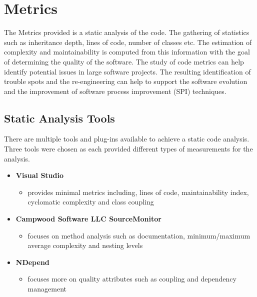 \section{Metrics}
		
	\normalsize
	{
		The Metrics provided is a static analysis of the code.  The gathering of statistics such as inheritance depth, lines of code, 
		number of classes etc.  The estimation of complexity and maintainability is computed from this information with the goal of 
		determining the quality of the software.  
		\newline
		\newline
		The study of code metrics can help identify potential issues in large software projects.
		The resulting identification of trouble spots and the re-engineering can help to support the software evolution and the
		improvement of software process improvement (SPI) techniques.

		\vspace{1mm}
		\subsection{Static Analysis Tools}
		There are multiple tools and plug-ins available to achieve a static code analysis.  Three tools were chosen as each provided
		different types of measurements for the analysis. 
		
		\vspace{1mm}
				
		\begin{itemize}
			\item \textbf{Visual Studio}
				\begin{itemize}
					\item provides minimal metrics including, lines of code, maintainability index, cyclomatic complexity and class coupling
				\end{itemize}
				
			\item \textbf{Campwood Software LLC SourceMonitor}
				\begin{itemize}
					\item focuses on method analysis such as documentation, minimum/maximum average complexity and nesting levels
				\end{itemize}	
									
			\item \textbf{NDepend}
				\begin{itemize}
					\item focuses more on quality attributes such as coupling and dependency management
				\end{itemize}
				

\end{itemize}}

